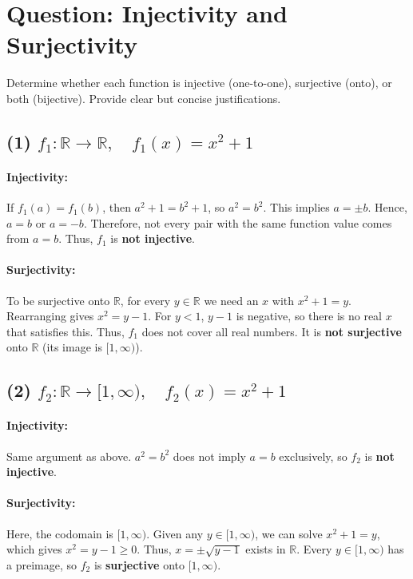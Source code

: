 \documentclass[12pt]{article}
\begin{document}
\section*{Question: Injectivity and Surjectivity}

Determine whether each function is injective (one-to-one), surjective (onto), or both (bijective). Provide clear but concise justifications.

\subsection*{(1) $f_1 : \mathbb{R} \to \mathbb{R}, \quad f_1(x) = x^2 + 1$}
\paragraph{Injectivity:}
If $f_1(a) = f_1(b)$, then $a^2 + 1 = b^2 + 1$, so $a^2 = b^2$. This implies $a = \pm b$. Hence, $a = b$ or $a = -b$. Therefore, not every pair with the same function value comes from $a=b$. Thus, $f_1$ is \textbf{not injective}.

\paragraph{Surjectivity:}
To be surjective onto $\mathbb{R}$, for every $y \in \mathbb{R}$ we need an $x$ with $x^2 + 1 = y$. Rearranging gives $x^2 = y - 1$. For $y < 1$, $y - 1$ is negative, so there is no real $x$ that satisfies this. Thus, $f_1$ does not cover all real numbers. It is \textbf{not surjective} onto $\mathbb{R}$ (its image is $[1, \infty)$).

\bigskip

\subsection*{(2) $f_2 : \mathbb{R} \to [1,\infty), \quad f_2(x) = x^2 + 1$}
\paragraph{Injectivity:}
Same argument as above. $a^2 = b^2$ does not imply $a=b$ exclusively, so $f_2$ is \textbf{not injective}.

\paragraph{Surjectivity:}
Here, the codomain is $[1,\infty)$. Given any $y \in [1,\infty)$, we can solve $x^2 + 1 = y$, which gives $x^2 = y-1 \ge 0$. Thus, $x = \pm\sqrt{y-1}$ exists in $\mathbb{R}$. Every $y \in [1,\infty)$ has a preimage, so $f_2$ is \textbf{surjective} onto $[1,\infty)$.
\end{document}
